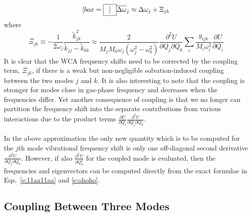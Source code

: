 \documentclass[a4paper,titlepage,twoside,fleqn,12pt]{book}
\newcommand*{\widebox}[2][0.5em]{\fbox{\hspace{#1}$\displaystyle #2$\hspace{#1}}}
\newcommand{\fderiv}[2]{\ensuremath{
    \frac{\partial #1}{\partial #2}}}
\newcommand{\sderiv}[2]{\ensuremath{
    \frac{\partial^2 #1}{\partial #2^2}
    }}
\newcommand{\sderivd}[3]{\ensuremath{
    \frac{\partial^2 #1}{\partial #2 \partial #3}
    }}
\begin{document}
\begin{refsection}
\begin{equation}[box=\widebox]
   \overline{\Delta\omega}_j \approx \Delta\omega_j + \Xi_{jk}
\end{equation}
%
where
%
\begin{equation}
 \Xi_{jk} \equiv -\frac{1}{2\omega_j} \frac{\tilde{k}_{jk}^2}{\tilde{k}_{jj} - \tilde{k}_{kk}}
 \approx \frac{2}{M_jM_k\omega_j\left(\omega_j^2 - \omega_k^2\right)} \sderivd{U}{Q_j}{Q_k}
 \sum_i \frac{g_{ijk}}{M_i\omega_i^2}  \fderiv{U}{Q_i}  
\end{equation}
%
It is clear that the WCA frequency shifts need to be corrected
by the coupling term, $\Xi_{jk}$, if there 
is a weak but non\hyp{}negligible solvation\hyp{}induced coupling 
between the two modes $j$ and $k$. It is also interesting
to note that the coupling is stronger for modes close in gas\hyp{}phase
frequency
and decreases when the frequencies differ. 
Yet another consequence of coupling is that 
we no longer can partition the frequency shift into the
separate contributions from various interactions due to the
product terms $\fderiv{U}{Q_i}\sderivd{U}{Q_j}{Q_k}$.

In the above approximation the only new quantity which is to
be computed for the $j$th mode vibrational frequency shift 
is only one off\hyp{}diagonal second derivative $\sderivd{U}{Q_j}{Q_k}$.
However, if also $\sderiv{U}{Q_k}$ for the coupled mode
is evaluated, then the frequencies and eigenvectors can be computed
directly from the exact formulae in Eqs.~\eqref{e:11aa11aa}
and \eqref{e:ohoho}.



\subsection{Coupling Between Three Modes\label{s:coupling-between-3-modes}}


\end{refsection}
\end{document}
